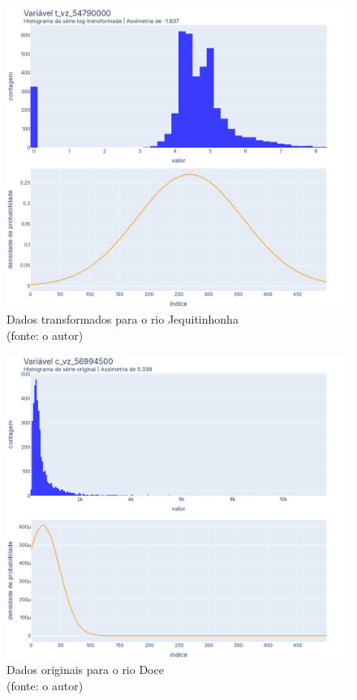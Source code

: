 \begin{figure}[!h]
	\centering
	\includegraphics[scale=0.8]{Figuras/jequiti/jequitinhonha_depois_log.png}
	\caption{Dados transformados para o rio Jequitinhonha\\(fonte: o autor)}
	\label{fig:jequitinhonha_depois_log}
\end{figure}

\begin{figure}[!h]
	\centering
	\includegraphics[scale=0.8]{Figuras/rio_doce/rio_doce_antes_log.png}
	\caption{Dados originais para o rio Doce\\(fonte: o autor)}
	\label{fig:rio_doce_antes_log}
\end{figure}

